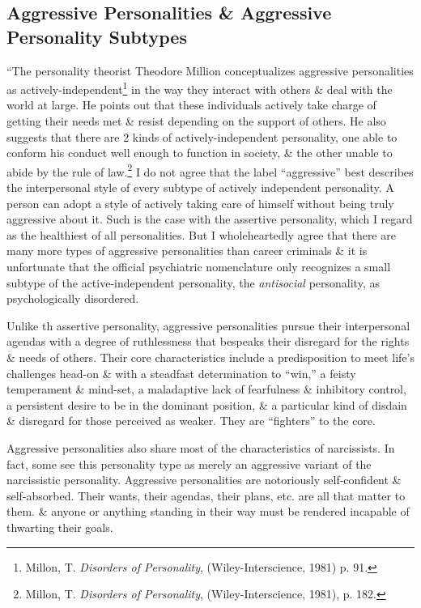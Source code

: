 \documentclass{article}
\numberwithin{equation}{section}
\begin{document}
\subsection{Aggressive Personalities \& Aggressive Personality Subtypes}
``The personality theorist Theodore Million conceptualizes aggressive personalities as actively-independent\footnote{Millon, T. \textit{Disorders of Personality}, (Wiley-Interscience, 1981) p. 91.} in the way they interact with others \& deal with the world at large. He points out that these individuals actively take charge of getting their needs met \& resist depending on the support of others. He also suggests that there are 2 kinds of actively-independent personality, one able to conform his conduct well enough to function in society, \& the other unable to abide by the rule of law.\footnote{Millon, T. \textit{Disorders of Personality}, (Wiley-Interscience, 1981), p. 182.} I do not agree that the label ``aggressive'' best describes the interpersonal style of every subtype of actively independent personality. A person can adopt a style of actively taking care of himself without being truly aggressive about it. Such is the case with the assertive personality, which I regard as the healthiest of all personalities. But I wholeheartedly agree that there are many more types of aggressive personalities than career criminals \& it is unfortunate that the official psychiatric nomenclature only recognizes a small subtype of the active-independent personality, the \textit{antisocial} personality, as psychologically disordered.

Unlike th assertive personality, aggressive personalities pursue their interpersonal agendas with a degree of ruthlessness that bespeaks their disregard for the rights \& needs of others. Their core characteristics include a predisposition to meet life's challenges head-on \& with a steadfast determination to ``win,'' a feisty temperament \& mind-set, a maladaptive lack of fearfulness \& inhibitory control, a persistent desire to be in the dominant position, \& a particular kind of disdain \& disregard for those perceived as weaker. They are ``fighters'' to the core.

Aggressive personalities also share most of the characteristics of narcissists. In fact, some see this personality type as merely an aggressive variant of the narcissistic personality. Aggressive personalities are notoriously self-confident \& self-absorbed. Their wants, their agendas, their plans, etc. are all that matter to them. \& anyone or anything standing in their way must be rendered incapable of thwarting their goals.
\end{document}
